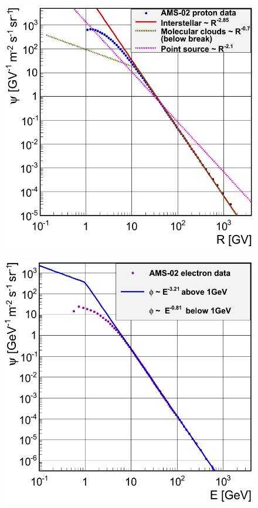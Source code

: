 \begin{figure}[h]
  \centering
  \begin{minipage}[h]{0.45\textwidth}
  	\centering
	\includegraphics[width=1.\linewidth]{pic/method/proton_shapes.png}
  	\subcaption{}
 	\label{fig:proton_spec}
  \end{minipage}
  \hfill
  \begin{minipage}[h]{0.45\textwidth}
	  \centering
	  \includegraphics[width=1.\linewidth]{pic/method/el_shapes.png}

\end{minipage}
\end{figure}
